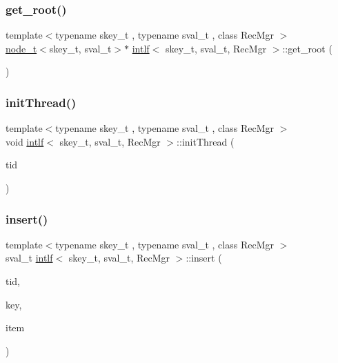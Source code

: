 \mbox{\label{classintlf_ac5a1a18fd5b9a34f3cbda1e2afd73bdd}} 
\subsubsection{\texorpdfstring{get\+\_\+root()}{get\_root()}}
{\footnotesize\ttfamily template$<$typename skey\+\_\+t , typename sval\+\_\+t , class Rec\+Mgr $>$ \\
\hyperlink{structnode__t}{node\+\_\+t}$<$skey\+\_\+t, sval\+\_\+t$>$$\ast$ \hyperlink{classintlf}{intlf}$<$ skey\+\_\+t, sval\+\_\+t, Rec\+Mgr $>$\+::get\+\_\+root (\begin{DoxyParamCaption}{ }\end{DoxyParamCaption})\hspace{0.3cm}{\ttfamily [inline]}}

\mbox{\label{classintlf_a4b001c748e2bb49c74a9d65204776c73}} 
\subsubsection{\texorpdfstring{init\+Thread()}{initThread()}}
{\footnotesize\ttfamily template$<$typename skey\+\_\+t , typename sval\+\_\+t , class Rec\+Mgr $>$ \\
void \hyperlink{classintlf}{intlf}$<$ skey\+\_\+t, sval\+\_\+t, Rec\+Mgr $>$\+::init\+Thread (\begin{DoxyParamCaption}\item[{const int}]{tid }\end{DoxyParamCaption})\hspace{0.3cm}{\ttfamily [inline]}}

\mbox{\label{classintlf_aee3e00131237612924107a00d5743f1c}} 
\subsubsection{\texorpdfstring{insert()}{insert()}}
{\footnotesize\ttfamily template$<$typename skey\+\_\+t , typename sval\+\_\+t , class Rec\+Mgr $>$ \\
sval\+\_\+t \hyperlink{classintlf}{intlf}$<$ skey\+\_\+t, sval\+\_\+t, Rec\+Mgr $>$\+::insert (\begin{DoxyParamCaption}\item[{const int}]{tid,  }\item[{skey\+\_\+t}]{key,  }\item[{sval\+\_\+t}]{item }\end{DoxyParamCaption})\hspace{0.3cm}{\ttfamily [inline]}}

